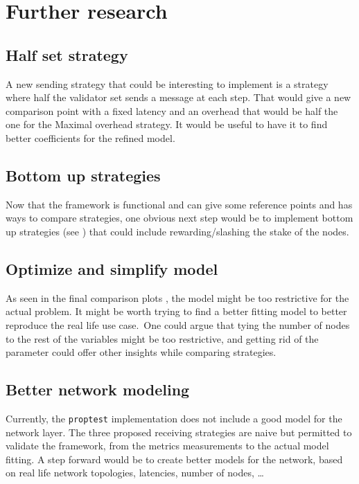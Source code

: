 \section{Further research}
\subsection{Half set strategy}
A new sending strategy that could be interesting to implement is a strategy
where half the validator set sends a message at each step. That would give a new
comparison point with a fixed latency and an overhead that would be half the one
for the Maximal overhead strategy. It would be useful to have it to find better
coefficients for the refined model.

\subsection{Bottom up strategies}
Now that the framework is functional and can give some reference points and has
ways to compare strategies, one obvious next step would be to implement bottom
up strategies (see ) that could include rewarding/slashing the stake of the nodes.

\subsection{Optimize and simplify model}
As seen in the final comparison plots , the model might be too restrictive for
the actual problem. It might be worth trying to find a better fitting model to
better reproduce the real life use case.\
One could argue that tying the number of nodes to the rest of the variables
might be too restrictive, and getting rid of the parameter could offer other
insights while comparing strategies.

\subsection{Better network modeling}
Currently, the \texttt{proptest} implementation does not include a good model
for the network layer. The three proposed receiving strategies are naive but
permitted to validate the framework, from the metrics measurements to the actual
model fitting. A step forward would be to create better models for the
network, based on real life network topologies, latencies, number of nodes, \ldots

